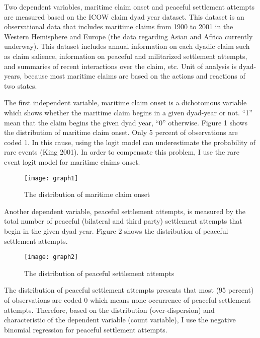 \documentclass{article}
\begin{document}
Two dependent variables, maritime claim onset and peaceful settlement attempts are measured based on the ICOW claim dyad year dataset. This dataset is an observational data that includes maritime claims from 1900 to 2001 in the Western Hemisphere and Europe (the data regarding Asian and Africa currently underway). This dataset includes annual information on each dyadic claim such as claim salience, information on peaceful and militarized settlement attempts, and summaries of recent interactions over the claim, etc. Unit of analysis is dyad-years, because most maritime claims are based on the actions and reactions of two states. 

The first independent variable, maritime claim onset is a dichotomous variable which shows whether the maritime claim begins in a given dyad-year or not. “1” mean that the claim begins the given dyad year, “0” otherwise. Figure 1 shows the distribution of maritime claim onset. Only 5 percent of observations are coded 1. In this cause, using the logit model can underestimate the probability of rare events (King 2001). In order to compensate this problem, I use the rare event logit model for maritime claims onset.
\\

\begin{figure}[h]
\centering
\texttt{[image: graph1]}
\caption{The distribution of maritime claim onset}
\end{figure}

Another dependent variable, peaceful settlement attempts, is measured by the total number of peaceful (bilateral and third party) settlement attempts that begin in the given dyad year. Figure 2 shows the distribution of peaceful settlement attempts. 

\begin{figure}[h]
\centering
\texttt{[image: graph2]}
\caption{The distribution of peaceful settlement attempts}
\end{figure}

The distribution of peaceful settlement attempts presents that most (95 percent) of observations are coded 0 which means none occurrence of peaceful settlement attempts. Therefore, based on the distribution (over-dispersion) and characteristic of the dependent variable (count variable), I use the negative binomial regression for peaceful settlement attempts.
\\
\end{document}
